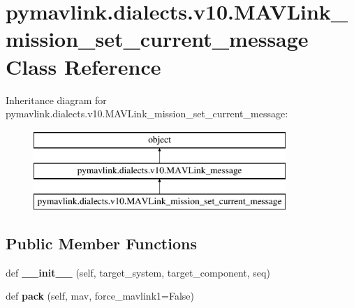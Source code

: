 \hypertarget{classpymavlink_1_1dialects_1_1v10_1_1MAVLink__mission__set__current__message}{}\section{pymavlink.\+dialects.\+v10.\+M\+A\+V\+Link\+\_\+mission\+\_\+set\+\_\+current\+\_\+message Class Reference}
\label{classpymavlink_1_1dialects_1_1v10_1_1MAVLink__mission__set__current__message}
Inheritance diagram for pymavlink.\+dialects.\+v10.\+M\+A\+V\+Link\+\_\+mission\+\_\+set\+\_\+current\+\_\+message\+:\begin{figure}[H]
\begin{center}
\leavevmode
\includegraphics[height=3.000000cm]{classpymavlink_1_1dialects_1_1v10_1_1MAVLink__mission__set__current__message}
\end{center}
\end{figure}
\subsection*{Public Member Functions}
\begin{DoxyCompactItemize}
\item 
\mbox{\label{classpymavlink_1_1dialects_1_1v10_1_1MAVLink__mission__set__current__message_a6c2b3fe4cc596ee4a669eeaecc5d7c06}} 
def {\bfseries \+\_\+\+\_\+init\+\_\+\+\_\+} (self, target\+\_\+system, target\+\_\+component, seq)
\item 
\mbox{\label{classpymavlink_1_1dialects_1_1v10_1_1MAVLink__mission__set__current__message_a3f2f057703b1f4b48cdd933a99c90e8f}} 
def {\bfseries pack} (self, mav, force\+\_\+mavlink1=False)
\end{DoxyCompactItemize}
